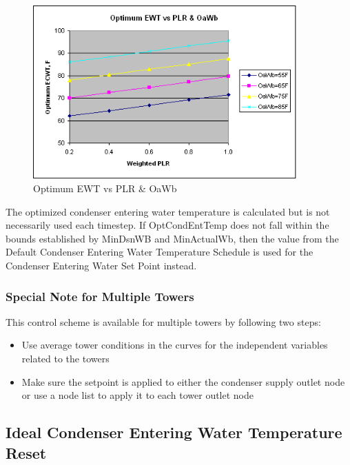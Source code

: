 \begin{figure}[hbtp] %
\centering
\includegraphics[width=0.9\textwidth, height=0.9\textheight, keepaspectratio=true]{media/image6484.png}
\caption{Optimum EWT vs PLR \& OaWb \protect \label{fig:optimum-ewt-vs-plr-oawb}}
\end{figure}

The optimized condenser entering water temperature is calculated but is not necessarily used each timestep. If OptCondEntTemp does not fall within the bounds established by MinDsnWB and MinActualWb, then the value from the Default Condenser Entering Water Temperature Schedule is used for the Condenser Entering Water Set Point instead.

\subsubsection{Special Note for Multiple Towers}\label{special-note-for-multiple-towers}

This control scheme is available for multiple towers by following two steps:

\begin{itemize}
\tightlist
\item
  Use average tower conditions in the curves for the independent variables related to the towers
\item
  Make sure the setpoint is applied to either the condenser supply outlet node or use a node list to apply it to each tower outlet node
\end{itemize}

\subsection{Ideal Condenser Entering Water Temperature Reset}\label{ideal-condenser-entering-water-temperature-reset}

